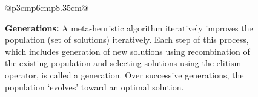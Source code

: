 \documentclass[sigconf,anonymous,review]{acmart}
\begin{document}
\begin{figure}
{\begin{tabular}{@{}p{3cm}p{6cm}p{8.35cm}@{}}
{\begin{minipage}[b]{\linewidth}
                \textbf{Generations: } {A meta-heuristic algorithm iteratively improves the population (set of solutions) iteratively. Each step of this process, which includes generation of new solutions using recombination of the existing population and selecting solutions using the elitism operator, is called a generation.  Over successive generations, the population `evolves' toward an optimal solution.}
                \end{minipage}\hspace{0.1cm}
                }
                 \\
                 \\ 
\end{tabular}}
\end{figure}
\end{document}
